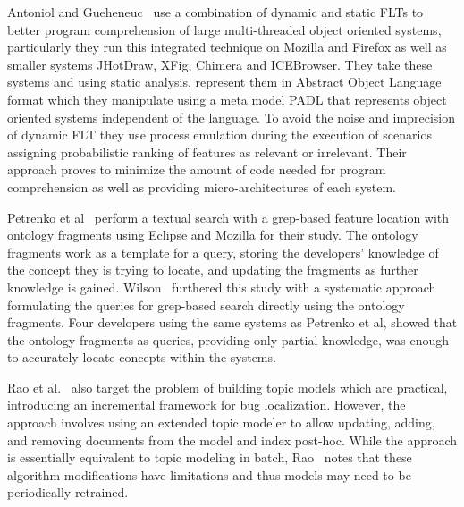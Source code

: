 Antoniol and Gueheneuc~\cite{Antoniol-Gueheneuc:2005, Antoniol-Gueheneuc:2006} use a combination of dynamic and
static FLTs to better program comprehension of large multi-threaded
object oriented systems, particularly they run this integrated technique on
Mozilla and Firefox as well as smaller systems JHotDraw, XFig, Chimera and
ICEBrowser. They take these systems and using static analysis, represent them
in Abstract Object Language format which they manipulate using a meta model
PADL that represents object oriented systems independent of the language. To
avoid the noise and imprecision of dynamic FLT they use process emulation
during the execution of scenarios assigning probabilistic ranking of features as
relevant or irrelevant. Their approach proves to minimize the amount of code
needed for program comprehension as well as providing micro-architectures of
each system.

Petrenko et al~\cite{Petrenko-etal:2008} perform a textual search with a grep-based
feature location with ontology fragments using Eclipse and Mozilla for their
study. The ontology fragments work as a template for a query, storing the
developers' knowledge of the concept they is trying to locate, and updating the
fragments as further knowledge is gained. Wilson~\cite{Wilson:2010} furthered this
study with a systematic approach formulating the queries for grep-based search
directly using the ontology fragments. Four developers using the same systems
as Petrenko et al, showed that the ontology fragments as queries, providing
only partial knowledge, was enough to accurately locate concepts within the
systems.

Rao et al.~\cite{Rao-etal:2013} also target the problem of building
topic models which are practical, introducing an incremental framework for bug localization.
However, the approach involves using an extended topic modeler to allow
updating, adding, and removing documents from the model and index post-hoc.
While the approach is essentially equivalent to topic modeling in batch,
Rao~\cite{Rao:2013} notes that these algorithm modifications have limitations and
thus models may need to be periodically retrained.
